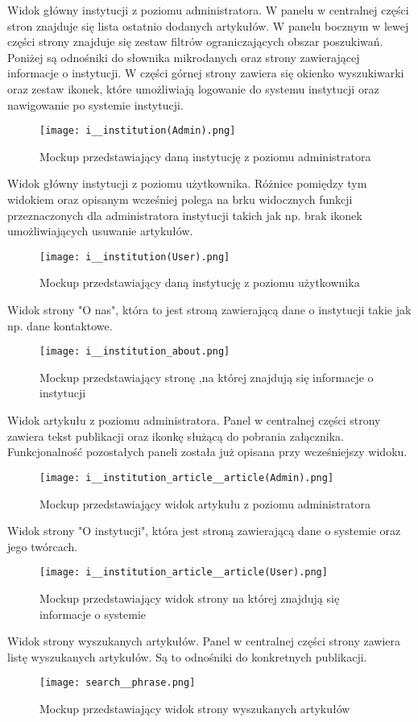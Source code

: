 \documentclass{article}
\begin{document}
	
	Widok główny instytucji z poziomu administratora. W panelu w centralnej części stron znajduje się lista
	ostatnio dodanych artykułów. W panelu bocznym w lewej części strony znajduje
	się zestaw filtrów ograniczających obszar poszukiwań. Poniżej są odnośniki do
	słownika mikrodanych oraz strony zawierającej informacje o instytucji.
	W części górnej strony zawiera się okienko wyszukiwarki oraz zestaw ikonek, 
	które umożliwiają logowanie do systemu instytucji oraz nawigowanie 
	po systemie instytucji.
\begin{figure}[h!]
	\texttt{[image: i\_\_institution(Admin).png]}
	\centering
	\caption{Mockup przedstawiający daną instytucję z poziomu administratora}
\end{figure}
	Widok główny instytucji z poziomu użytkownika.
	Różnice pomiędzy tym widokiem oraz opisanym wcześniej polega na brku widocznych
	funkcji przeznaczonych dla administratora instytucji takich jak np. brak ikonek
	umożliwiających usuwanie artykułów.	
\begin{figure}[h!]
	\texttt{[image: i\_\_institution(User).png]}
	\centering
	\caption{Mockup przedstawiający daną instytucję z poziomu użytkownika}
\end{figure}
	\newpage
	
	
	Widok strony "O nas", która to jest stroną zawierającą dane o instytucji takie
	jak np. dane kontaktowe.
\begin{figure}[h!]
	\texttt{[image: i\_\_institution\_about.png]}
	\centering
	\caption{Mockup przedstawiający stronę ,na której znajdują się informacje o instytucji }
\end{figure}
	Widok artykułu z poziomu administratora.
	Panel w centralnej części strony zawiera tekst publikacji oraz ikonkę służącą
	do pobrania załącznika. Funkcjonalność pozostałych paneli została już opisana
	przy wcześniejszy widoku.

\begin{figure}[h!]
	\texttt{[image: i\_\_institution\_article\_\_article(Admin).png]}
	\centering
	\caption{Mockup przedstawiający widok artykułu z poziomu administratora}
\end{figure}
	\newpage
	Widok strony "O instytucji", która jest stroną zawierającą dane o systemie oraz
	jego twórcach.
\begin{figure}[h!]
	\texttt{[image: i\_\_institution\_article\_\_article(User).png]}
	\centering
	\caption{Mockup przedstawiający widok strony na której znajdują się informacje o systemie}
\end{figure}
	Widok strony wyszukanych artykułów.
	Panel w centralnej części strony zawiera listę wyszukanych artykułów. Są to 
	odnośniki do konkretnych publikacji.
\begin{figure}[h!]
	\texttt{[image: search\_\_phrase.png]}
	\centering
	\caption{Mockup przedstawiający widok strony wyszukanych artykułów}
\end{figure}
\end{document}
